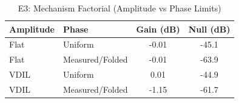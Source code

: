 \begin{table}[h]
\centering
\caption{E3: Mechanism Factorial (Amplitude vs Phase Limits)}
\begin{tabular}{llcc}
\toprule
Amplitude & Phase & Gain (dB) & Null (dB) \\
\midrule
Flat & Uniform & -0.01 & -45.1 \\
Flat & Measured/Folded & -0.01 & -63.9 \\
VDIL & Uniform & 0.01 & -44.9 \\
VDIL & Measured/Folded & -1.15 & -61.7 \\
\bottomrule
\end{tabular}
\end{table}
